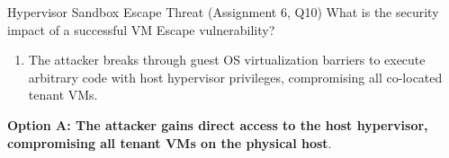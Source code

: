 \begin{solved}{Hypervisor Sandbox Escape Threat (Assignment 6, Q10)}
\Given What is the security impact of a successful VM Escape vulnerability?
\Steps
\begin{enumerate}[leftmargin=*]
  \item The attacker breaks through guest OS virtualization barriers to execute arbitrary code with host hypervisor privileges, compromising all co-located tenant VMs.
\end{enumerate}
\Answer \textbf{Option A: The attacker gains direct access to the host hypervisor, compromising all tenant VMs on the physical host}.
\end{solved}
